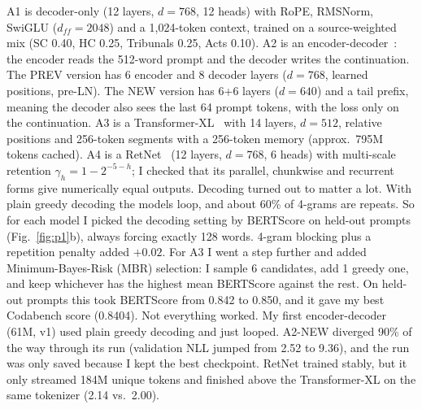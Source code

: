 \documentclass[11pt, oneside]{article}
\begin{document}
A1 is decoder-only (12 layers, $d{=}768$, 12 heads) with RoPE, RMSNorm,
SwiGLU ($d_{ff}{=}2048$) and a 1,024-token context, trained on a
source-weighted mix (SC 0.40, HC 0.25, Tribunals 0.25, Acts 0.10). A2 is an
encoder-decoder~\cite{vaswani2017attention}: the encoder reads the 512-word prompt and the
decoder writes the continuation. The PREV version has 6 encoder and 8 decoder
layers ($d{=}768$, learned positions, pre-LN). The NEW version has 6+6 layers
($d{=}640$) and a tail prefix, meaning the decoder also sees the last 64
prompt tokens, with the loss only on the continuation. A3 is a
Transformer-XL~\cite{dai2019transformerxl} with 14 layers, $d{=}512$, relative positions and
256-token segments with a 256-token memory (approx.\ 795M tokens cached). A4 is
a RetNet~\cite{sun2023retnet} (12 layers, $d{=}768$, 6 heads) with multi-scale
retention $\gamma_h = 1 - 2^{-5-h}$; I checked that its parallel, chunkwise
and recurrent forms give numerically equal outputs.
Decoding turned out to matter a lot. With plain greedy decoding the models
loop, and about 60\% of 4-grams are repeats. So for each model I picked the
decoding setting by BERTScore on held-out prompts (Fig.~\ref{fig:p1}b), always forcing
exactly 128 words. 4-gram blocking plus a repetition penalty added $+0.02$.
For A3 I went a step further and added Minimum-Bayes-Risk (MBR) selection: I
sample 6 candidates, add 1 greedy one, and keep whichever has the highest mean
BERTScore against the rest. On held-out prompts this took BERTScore from 0.842
to 0.850, and it gave my best Codabench score (0.8404).
Not everything worked. My first encoder-decoder (61M, v1) used plain greedy
decoding and just looped. A2-NEW diverged 90\% of the way through its run
(validation NLL jumped from 2.52 to 9.36), and the run was only saved because
I kept the best checkpoint. RetNet trained stably, but it only streamed 184M
unique tokens and finished above the Transformer-XL on the same tokenizer
(2.14 vs.\ 2.00).
\end{document}
